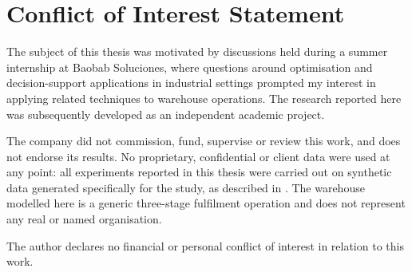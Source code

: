 \chapter*{Conflict of Interest Statement}

The subject of this thesis was motivated by discussions held during a summer internship at
Baobab Soluciones, where questions around optimisation and decision-support applications in
industrial settings prompted my interest in applying related techniques to warehouse
operations. The research reported here was subsequently developed as an independent academic
project.

The company did not commission, fund, supervise or review this work, and does not endorse its
results. No proprietary, confidential or client data were used at any point: all experiments
reported in this thesis were carried out on synthetic data generated specifically for the
study, as described in . The warehouse modelled here is a
generic three-stage fulfilment operation and does not represent any real or named organisation.

The author declares no financial or personal conflict of interest in relation to this work.
